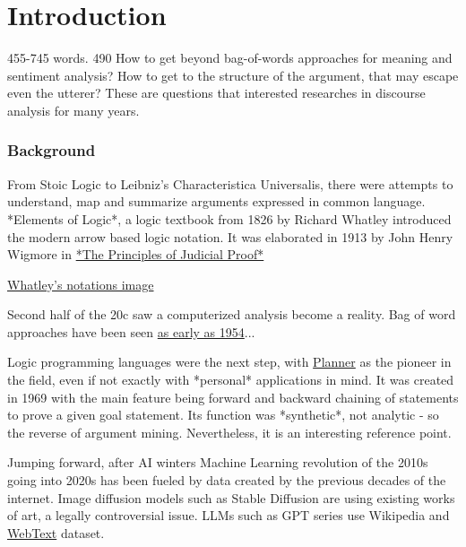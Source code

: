 \documentclass{article}
\begin{document}
\newpage

\tableofcontents

\newpage

\chapter{Introduction} 455-745 words. 490
How to get beyond bag-of-words approaches for meaning and sentiment analysis? How to get to the structure of the argument, that may escape even the utterer?
These are questions that interested researches in discourse analysis for many years.

\subsection{Background}
From Stoic Logic to Leibniz's Characteristica Universalis, there were attempts to understand, map and summarize arguments expressed in common language. 
*Elements of Logic*, a logic textbook from 1826 by Richard Whatley introduced the modern arrow based logic notation. It was elaborated in 1913 by John Henry Wigmore in \href{https://archive.org/details/principlesjudic00wigmgoog}{*The Principles of Judicial Proof*}

\href{https://commons.wikimedia.org/wiki/File:Whatley.png}{Whatley's notations image}

Second half of the 20c saw a computerized analysis become a reality. Bag of word approaches have been seen \href{https://www.tandfonline.com/doi/abs/10.1080/00437956.1954.11659520}{as early as 1954}...

Logic programming languages were the next step, with \href{https://en.wikipedia.org/wiki/Planner_(programming_language)}{Planner} as the pioneer in the field, even if not exactly with *personal* applications in mind.  It was created in 1969 with the main feature being forward and backward chaining of statements to prove a given goal statement.
Its function was *synthetic*, not analytic - so the reverse of argument mining. Nevertheless, it is an interesting reference point.

Jumping forward, after AI winters Machine Learning revolution of the 2010s going into 2020s has been fueled by data created by the previous decades of the internet. Image diffusion models such as Stable Diffusion are using existing works of art, a legally controversial issue. LLMs such as GPT series use Wikipedia and \href{https://paperswithcode.com/dataset/webtext}{WebText} dataset.
\end{document}
